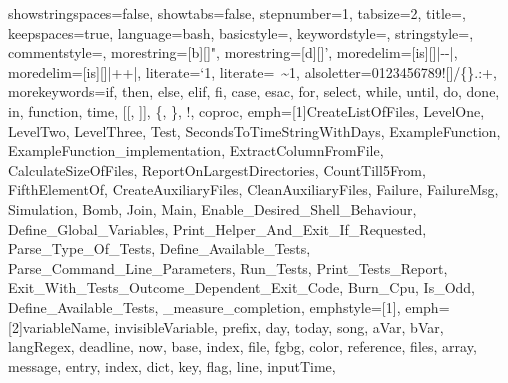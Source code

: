 {showstringspaces=false,             %
showtabs=false,                     %
stepnumber=1,                       %
tabsize=2,                          %
title=\lstname,                     %
%
keepspaces=true,                    %
language=bash,
basicstyle=\ttfamily\scriptsize\color{basic-color},
keywordstyle=\color{keywords-color},
stringstyle=\color{strings-color},
commentstyle=\color{comment-color},
morestring=[b][\color{strings-color}]{"},
morestring=[d][\color{strings-color}]{'},
moredelim=[is][\color{strings-color}]{|-}{-|}, %
moredelim=[is][\color{basic-color}]{|+}{+|}, %
literate={`}{\textasciigrave}1, %
literate={~}{{\textasciitilde}}1,
alsoletter=0123456789![]/\{\}.:+, %
morekeywords={if, then, else, elif, fi, case, esac, for, select, while, until, do, done, in, function, time, [[, ]], \{, \}, !, coproc}, %
emph=[1]{CreateListOfFiles, LevelOne, LevelTwo, LevelThree, Test, SecondsToTimeStringWithDays, ExampleFunction,
         ExampleFunction_implementation, ExtractColumnFromFile, CalculateSizeOfFiles, ReportOnLargestDirectories,
         CountTill5From, FifthElementOf, CreateAuxiliaryFiles, CleanAuxiliaryFiles, Failure, FailureMsg, Simulation, Bomb, Join, Main, Enable_Desired_Shell_Behaviour, Define_Global_Variables, Print_Helper_And_Exit_If_Requested, Parse_Type_Of_Tests, Define_Available_Tests, Parse_Command_Line_Parameters, Run_Tests, Print_Tests_Report, Exit_With_Tests_Outcome_Dependent_Exit_Code, Burn_Cpu, Is_Odd, Define_Available_Tests, _measure_completion},
emphstyle=[1]{\color{functions-color}}, %
emph=[2]{variableName, invisibleVariable, prefix, day, today, song, aVar, bVar, langRegex, deadline, now, base,
         index, file, fgbg, color, reference, files, array, message, entry, index, dict, key, flag, line, inputTime,
}}
